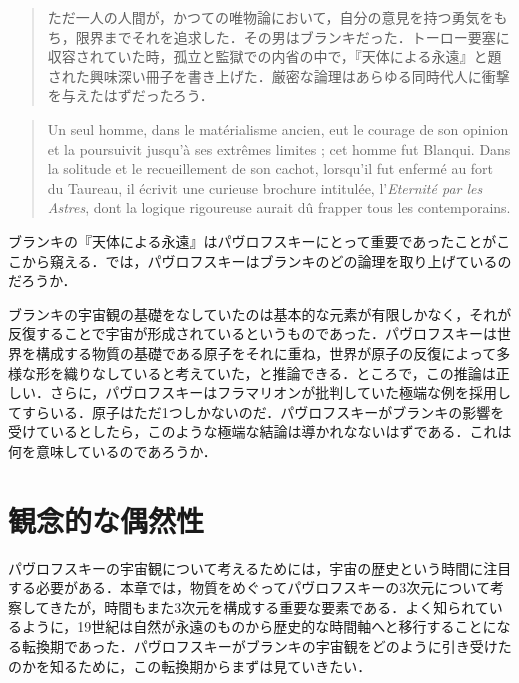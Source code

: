 \begin{quote}
ただ一人の人間が，かつての唯物論において，自分の意見を持つ勇気をもち，限界までそれを追求した．その男はブランキだった．トーロー要塞に収容されていた時，孤立と監獄での内省の中で，『天体による永遠』と題された興味深い冊子を書き上げた．厳密な論理はあらゆる同時代人に衝撃を与えたはずだったろう．
\end{quote}
\begin{quote}
Un seul homme, dans le matérialisme ancien, eut le courage de son opinion et la poursuivit jusqu'à ses extrêmes limites ; cet homme fut Blanqui. Dans la solitude et le recueillement de son cachot, lorsqu'il fut enfermé au fort du Taureau, il écrivit une curieuse brochure intitulée, l'\emph{Eternité par les Astres}, dont la logique rigoureuse aurait dû frapper tous les contemporains.
\end{quote}

ブランキの『天体による永遠』はパヴロフスキーにとって重要であったことがここから窺える．では，パヴロフスキーはブランキのどの論理を取り上げているのだろうか．

ブランキの宇宙観の基礎をなしていたのは基本的な元素が有限しかなく，それが反復することで宇宙が形成されているというものであった．パヴロフスキーは世界を構成する物質の基礎である原子をそれに重ね，世界が原子の反復によって多様な形を織りなしていると考えていた，と推論できる．ところで，この推論は正しい．さらに，パヴロフスキーはフラマリオンが批判していた極端な例を採用してすらいる．原子はただ1つしかないのだ．パヴロフスキーがブランキの影響を受けているとしたら，このような極端な結論は導かれなないはずである．これは何を意味しているのであろうか．

\section{観念的な偶然性}

パヴロフスキーの宇宙観について考えるためには，宇宙の歴史という時間に注目する必要がある．本章では，物質をめぐってパヴロフスキーの3次元について考察してきたが，時間もまた3次元を構成する重要な要素である．よく知られているように，19世紀は自然が永遠のものから歴史的な時間軸へと移行することになる転換期であった．パヴロフスキーがブランキの宇宙観をどのように引き受けたのかを知るために，この転換期からまずは見ていきたい．

